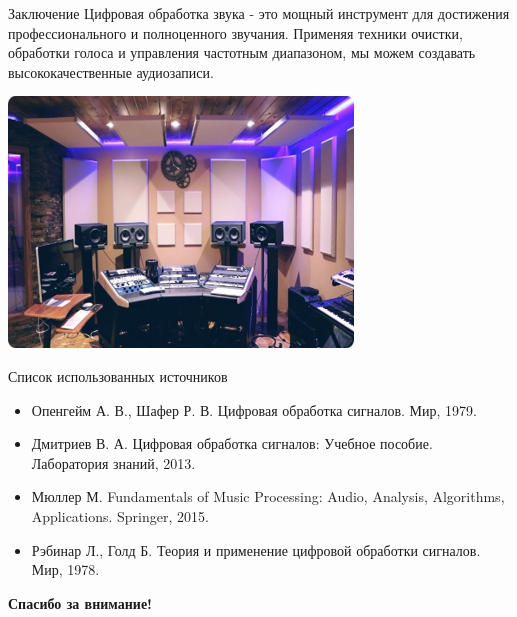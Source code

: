 \documentclass{beamer}
\begin{document}
\begin{frame}{Заключение}
	Цифровая обработка звука - это мощный инструмент для достижения профессионального и полноценного звучания. Применяя техники очистки, обработки голоса и управления частотным диапазоном, мы можем создавать высококачественные аудиозаписи.
	\begin{center}
		\includegraphics[width=0.6\linewidth]{pic7.png} %
	\end{center}
\end{frame}

\begin{frame}{Список использованных источников}
    \begin{itemize}
        \item Опенгейм А. В., Шафер Р. В. Цифровая обработка сигналов. Мир, 1979.
        \item Дмитриев В. А. Цифровая обработка сигналов: Учебное пособие. Лаборатория знаний, 2013.
        \item Мюллер М. Fundamentals of Music Processing: Audio, Analysis, Algorithms, Applications. Springer, 2015.
        \item Рэбинар Л., Голд Б. Теория и применение цифровой обработки сигналов. Мир, 1978.
    \end{itemize}
\end{frame}

\begin{frame}
    \centering
    \textbf{\huge Спасибо за внимание!}
\end{frame}
\end{document}
